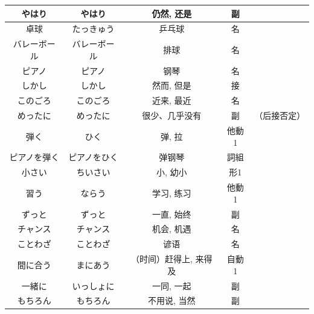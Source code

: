 \begin{longtable}{|c|c|c|c|c|}
やはり & やはり & 仍然, 还是 & 副 & \\ \hline
卓球 & たっきゅう & 乒乓球 & 名 & \\ \hline
バレーボール & バレーボール & 排球 & 名 & \\ \hline
ピアノ & ピアノ & 钢琴 & 名 & \\ \hline
しかし & しかし & 然而, 但是 & 接 & \\ \hline
このごろ & このごろ & 近来, 最近 & 名 & \\ \hline
めったに & めったに & 很少、几乎没有 & 副 & （后接否定） \\ \hline
弾く & ひく & 弹, 拉 & 他動1 & \\ \hline
ピアノを弾く & ピアノをひく & 弹钢琴 & 詞組 & \\ \hline
小さい & ちいさい & 小, 幼小 & 形1 & \\ \hline
習う & ならう & 学习, 练习 & 他動1 & \\ \hline
ずっと & ずっと & 一直, 始终 & 副 & \\ \hline
チャンス & チャンス & 机会, 机遇 & 名 & \\ \hline
ことわざ & ことわざ & 谚语 & 名 & \\ \hline
間に合う & まにあう & （时间）赶得上, 来得及 & 自動1 & \\ \hline
一緒に & いっしょに & 一同, 一起 & 副 & \\ \hline
もちろん & もちろん & 不用说, 当然 & 副 & \\ \hline
\end{longtable}



